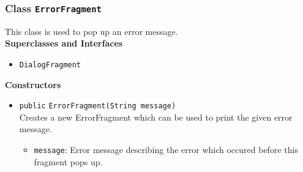 \subsubsection{Class \lstinline|ErrorFragment|}
This class is used to pop up an error message. \\


\textbf{Superclasses and Interfaces}
\begin{itemize}
\item \lstinline|DialogFragment|
\end{itemize}



\textbf{Constructors}
\begin{itemize}
\item \lstinline|public| \lstinline|ErrorFragment|\lstinline|(String message)|\\
Creates a new ErrorFragment which can be used to print the given error message.
\begin{itemize}
\item \lstinline|message|: Error message describing the error which occured before this fragment pops up.
\end{itemize}



\end{itemize}



